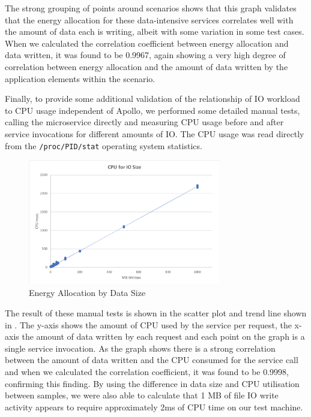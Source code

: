 The strong grouping of points around scenarios shows that this graph validates that the energy allocation for these data-intensive services correlates well with the amount of data each is writing, albeit with some variation in some test cases. When we calculated the correlation coefficient between energy allocation and data written, it was found to be 0.9967, again showing a very high degree of correlation between energy allocation and the amount of data written by the application elements within the scenario.

Finally, to provide some additional validation of the relationship of IO workload to CPU usage independent of Apollo, we performed some detailed manual tests, calling the microservice directly and measuring CPU usage before and after service invocations for different amounts of IO.  The CPU usage was read directly from the \texttt{/proc/PID/stat} operating system statistics.

\begin{figure}
\centering
\includegraphics[width=0.75\textwidth,trim={3 2 2 2},clip]{Figures/validation-cpubydatasize}
\caption{Energy Allocation by Data Size}
\label{figure:validation-cpubydatasize}
\end{figure}

The result of these manual tests is shown in the scatter plot and trend line shown in .  The y-axis shows the amount of CPU used by the service per request, the x-axis the amount of data written by each request and each point on the graph is a single service invocation.  As the graph shows there is a strong correlation between the amount of data written and the CPU consumed for the service call and when we calculated the correlation coefficient, it was found to be 0.9998, confirming this finding.  By using the difference in data size and CPU utilisation between samples, we were also able to calculate that 1 MB of file IO write activity appears to require approximately 2ms of CPU time on our test machine.

